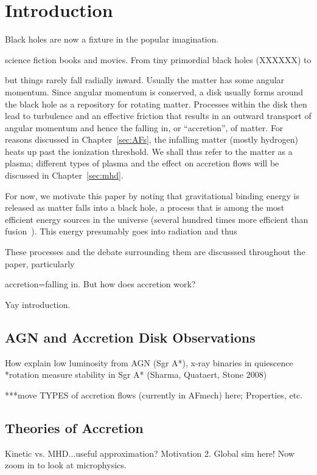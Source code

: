 \chapter{Introduction}
Black holes are now a fixture in the popular imagination. 

science fiction books and movies. From tiny primordial black holes (XXXXXX) to 

but things rarely fall radially inward. Usually the matter has some angular momentum. Since angular momentum is conserved, a disk usually forms around the black hole as a repository for rotating matter. Processes within the disk then lead to turbulence and an effective friction that results in an outward transport of angular momentum and hence the falling in, or ``accretion'', of matter. For reasons discussed in Chapter~\ref{sec:AFs}, the infalling matter (mostly hydrogen) heats up past the ionization threshold. We shall thus refer to the matter as a plasma; different types of plasma and the effect on accretion flows will be discussed in Chapter~\ref{sec:mhd}.

For now, we motivate this paper by noting that gravitational binding energy is released as matter falls into a black hole, a process that is among the most efficient energy sources in the universe (several hundred times more efficient than fusion~\cite{Blandford1999}). This energy presumably goes into radiation and thus 

These processes and the debate surrounding them are discusssed throughout the paper, particularly 

accretion=falling in. But how does accretion work?

Yay introduction.
\section{AGN and Accretion Disk Observations}
How explain low luminosity from AGN (Sgr A*), x-ray binaries in quiescence
*rotation measure  stability in Sgr A* (Sharma, Quataert, Stone 2008)
 
***move TYPES of accretion flows (currently in AFmech) here; Properties, etc.

\section{Theories of Accretion}
Kinetic vs. MHD...useful approximation? Motivation 2.
Global sim here! Now zoom in to look at microphysics.
